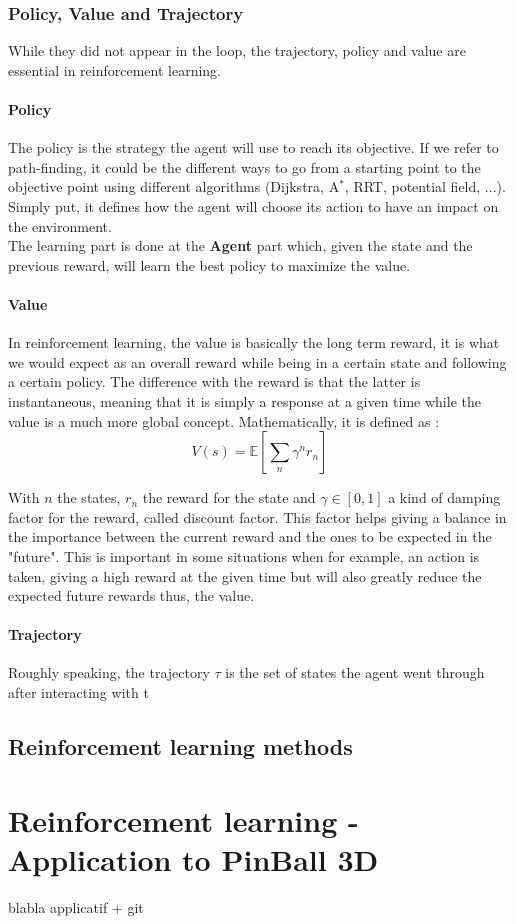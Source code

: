 \documentclass[a4paper,12pt,calibri,oneside,openany]{book}
\theoremstyle{break}
\begin{document}
\subsection{Policy, Value and Trajectory}
While they did not appear in the loop, the trajectory, policy and value are essential in reinforcement learning.\\
\subsubsection{Policy}
\qquad The policy is the strategy the agent will use to reach its objective. If we refer to path-finding, it could be the different ways to go from a starting point to the objective point using different algorithms (Dijkstra, A$^*$, RRT, potential field, ...). Simply put, it defines how the agent will choose its action to have an impact on the environment. \\

The learning part is done at the \textbf{Agent} part which, given the state and the previous reward, will learn the best policy to maximize the value.
\subsubsection{Value}
\qquad In reinforcement learning, the value is basically the long term reward, it is what we would expect as an overall reward while being in a certain state and following a certain policy. The difference with the reward is that the latter is instantaneous, meaning that it is simply a response at a given time while the value is a much more global concept. Mathematically, it is defined as :
$$
V(s)=\mathbb{E}\left[\sum_{n}\gamma^n r_n\right]
$$

With $n$ the states, $r_n$ the reward for the state and $\gamma\in[0,1]$ a kind of damping factor for the reward, called discount factor. This factor helps giving a balance in the importance between the current reward and the ones to be expected in the "future". This is important in some situations when for example, an action is taken, giving a high reward at the given time but will also greatly reduce the expected future rewards thus, the value.
\subsubsection{Trajectory}
\qquad Roughly speaking, the trajectory $\tau$ is the set of states the agent went through after interacting with t
\section{Reinforcement learning methods}



\chapter{Reinforcement learning - Application to PinBall 3D}
blabla applicatif + git
\end{document}

